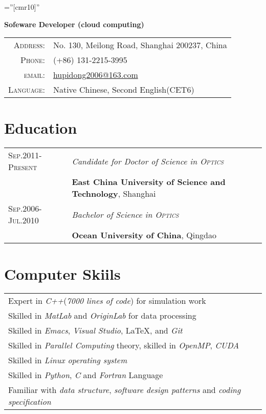\documentclass[a4paper,11pt]{article}
\begin{document}

\pagestyle{empty} %

\font\fb=''[cmr10]'' %

\par{
		{  } \textbf{Sofeware Developer (cloud computing)}

\begin{tabular}{rl}
    \textsc{Address:}   & No. 130, Meilong Road, Shanghai 200237, China \\
    \textsc{Phone:}     & (+86) 131-2215-3995 \\
    \textsc{email:}     & \href{hupidong2006@163.com}{hupidong2006@163.com}\\
    \textsc{Language:}	&Native Chinese, Second English(CET6)
\end{tabular}
\section{Education}
\begin{tabular}{ll}	
\textsc{Sep.2011-Present} &\emph{ Candidate for Doctor of Science in \textsc{Optics}}\\
&\normalsize\textbf{East China University of Science and Technology}, Shanghai\\
\textsc{Sep.2006-Jul.2010} &\emph{ Bachelor of Science in \textsc{Optics}} \\
&\normalsize\textbf{Ocean University of China}, Qingdao\\
\end{tabular}
\section{Computer Skiils}
\begin{tabular}{l}	
Expert in \emph{C++}(\emph{7000 lines of code}) for simulation work\\
Skilled in \emph{MatLab} and \emph{OriginLab} for data processing\\
Skilled in \emph{Emacs}, \emph{Visual Studio}, \LaTeX, and \emph{Git}\\
Skilled in \emph{Parallel Computing} theory, skilled in \emph{OpenMP}, \emph{CUDA}\\
Skilled in \emph{Linux operating system}\\
Skilled in \emph{Python}, \emph{C} and \emph{Fortran} Language\\
Familiar with \emph{data structure}, \emph{software design patterns} and \emph{coding specification}
\end{tabular}
}
\end{document}
